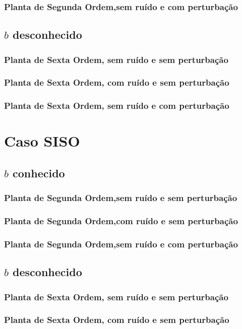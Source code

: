 \documentclass[
	12pt,				%
	openright,			%
	twoside,			%
	a4paper,			%
	english,			%
	french,				%
	spanish,			%
	brazil				%
	]{abntex2}
\begin{document}
\subsubsection{Planta de Segunda Ordem,sem ruído e com perturbação}
\subsection{$b$ desconhecido}
\subsubsection{Planta de Sexta Ordem, sem ruído e sem perturbação}
\subsubsection{Planta de Sexta Ordem, com ruído e sem perturbação}
\subsubsection{Planta de Sexta Ordem, sem ruído e com perturbação}
\section{Caso SISO}
\subsection{$b$ conhecido}
\subsubsection{Planta de Segunda Ordem,sem ruído e sem perturbação}
\subsubsection{Planta de Segunda Ordem,com ruído e sem perturbação}
\subsubsection{Planta de Segunda Ordem,sem ruído e com perturbação}
\subsection{$b$ desconhecido}
\subsubsection{Planta de Sexta Ordem, sem ruído e sem perturbação}
\subsubsection{Planta de Sexta Ordem, com ruído e sem perturbação}
\end{document}
